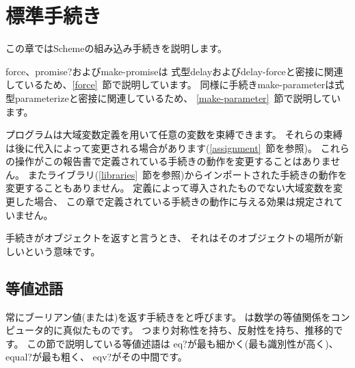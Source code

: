 
\chapter{標準手続き}
\label{initialenv}
\label{builtinchapter}


この章ではSchemeの組み込み手続きを説明します。

{\cf force}、{\cf promise?}および{\cf make-promise}は
式型{\cf delay}および{\cf delay-force}と密接に関連しているため、\ref{force}~節で説明しています。
同様に手続き{\cf make-parameter}は式型{\cf parameterize}と密接に関連しているため、
\ref{make-parameter}~節で説明しています。

プログラムは大域変数定義を用いて任意の変数を束縛できます。
それらの束縛は後に代入によって変更される場合があります(\ref{assignment}~節を参照)。
これらの操作がこの報告書で定義されている手続きの動作を変更することはありません。
またライブラリ(\ref{libraries}~節を参照)からインポートされた手続きの動作を変更することもありません。
定義によって導入されたものでない大域変数を変更した場合、
この章で定義されている手続きの動作に与える効果は規定されていません。

手続きがオブジェクトを返すと言うとき、
それはそのオブジェクトの場所が新しいという意味です。

\section{等値述語}
\label{equivalencesection}

常にブーリアン値(\schtrue{}または\schfalse)を返す手続きをと呼びます。
は数学の等値関係をコンピュータ的に真似たものです。
つまり対称性を持ち、反射性を持ち、推移的です。
この節で説明している等値述語は
{\cf eq?}が最も細かく(最も識別性が高く)、
{\cf equal?}が最も粗く、
{\cf eqv?}がその中間です。


